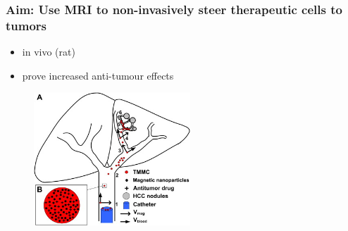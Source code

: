 \documentclass[8pt,xcolor=table]{beamer}
\begin{document}
\begin{frame}
\frametitle{Aim: Use MRI to non-invasively steer therapeutic cells to tumors}

\begin{itemize}
 \item in vivo (rat)
 \item prove increased anti-tumour effects
\end{itemize}


 \begin{figure}
 \centering
 \includegraphics[height=5cm]{steering}
 \end{figure}
 
\end{frame}
\end{document}
